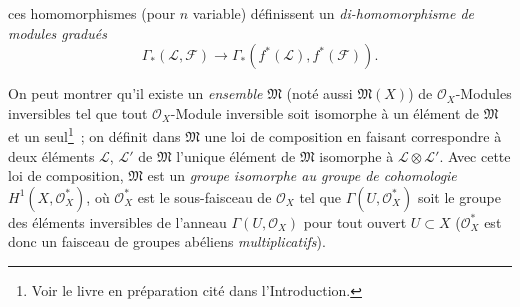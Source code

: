 \begin{env}[5.4.6]

ces homomorphismes (pour $n$ variable) définissent un
\emph{di-homomorphisme de modules gradués}
\[
  \Gamma_*(\mathcal{L},\mathcal{F})
  \longrightarrow
  \Gamma_*(f^*(\mathcal{L}),f^*(\mathcal{F})).
\]
\end{env}

\begin{env}[5.4.7]
On peut montrer qu'il existe un \emph{ensemble} $\mathfrak{M}$ (noté aussi
$\mathfrak{M}(X)$) de $\mathcal{O}_X$-Modules inversibles tel que tout
$\mathcal{O}_X$-Module inversible soit isomorphe à un élément de
$\mathfrak{M}$ et un seul\footnote{Voir le livre en préparation cité dans
l'Introduction.}~; on définit dans $\mathfrak{M}$ une loi de composition en
faisant correspondre à deux éléments $\mathcal{L}$, $\mathcal{L}'$ de
$\mathfrak{M}$ l'unique élément de $\mathfrak{M}$ isomorphe à
$\mathcal{L}\otimes\mathcal{L}'$. Avec cette loi de
composition, $\mathfrak{M}$ est un \emph{groupe isomorphe au groupe de
cohomologie} $H^1(X,\mathcal{O}_X^*)$, où $\mathcal{O}_X^*$ est le
sous-faisceau de $\mathcal{O}_X$ tel que $\Gamma(U,\mathcal{O}_X^*)$ soit le
groupe des éléments inversibles de l'anneau $\Gamma(U,\mathcal{O}_X)$ pour
tout ouvert $U\subset X$ ($\mathcal{O}_X^*$ est donc un faisceau de groupes
abéliens \emph{multiplicatifs}).


\end{env}
